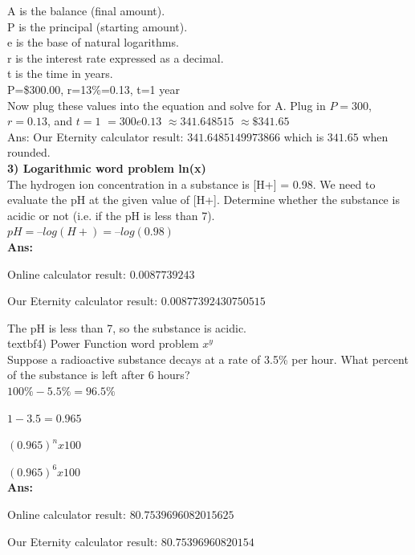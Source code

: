 \documentclass[a4paper, 12pt]{article}
\begin{document}
A is the balance (final amount).\\
P is the principal (starting amount).\\
e is the base of natural logarithms.\\
r is the interest rate expressed as a decimal.\\
t is the time in years.\\
P=\$300.00, r=13\%=0.13, t=1 year\\

Now plug these values into the equation and solve for A.
Plug in $P = 300$, $r = 0.13$, and $t=1$
$= 300e0.13$
$\approx 341.648515$
$\approx \$341.65$
\\

Ans: Our Eternity calculator result: $341.6485149973866$ which is $341.65$ when rounded.
\\

\textbf{3) Logarithmic word problem ln(x)}
\\

The hydrogen ion concentration in a substance is [H+] = 0.98. We need to evaluate the pH at the given value of [H+]. Determine whether the substance is acidic or not (i.e. if the pH is less than 7).
\\

$pH = – log(H+) = – log(0.98)$
\\

\textbf{Ans:}

Online calculator result: $0.0087739243$

Our Eternity calculator result: $0.00877392430750515$

The pH is less than 7, so the substance is acidic.
\\

textbf{4) Power Function word problem $x^y$}
\\

Suppose a radioactive substance decays at a rate of 3.5\% per hour. What percent of the substance is left after 6 hours? 
\\

$100\%-5.5\% = 96.5\%$

$1-3.5 = 0.965$

$(0.965)^n x 100$

$(0.965)^6 x 100$
\\

\textbf{Ans:}

Online calculator result: $80.7539696082015625$

Our Eternity calculator result: $80.75396960820154$
\\
\end{document}
